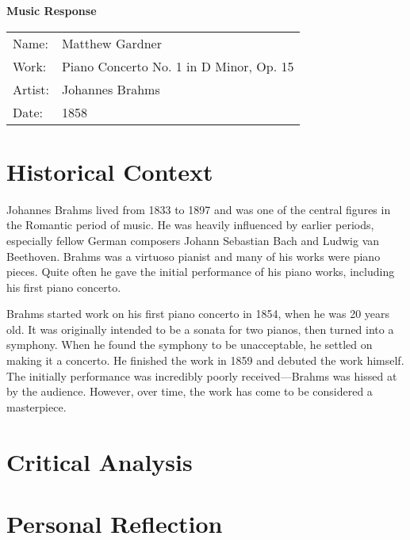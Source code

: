 \documentclass[onecolumn, 12pt]{article}
\title{}
\author{Matthew Gardner}
\date{}
\begin{document}
\textbf{Music Response}

\begin{tabular}{ll}
  Name:&Matthew Gardner \\
  Work:&Piano Concerto No. 1 in D Minor, Op. 15 \\
  Artist:&Johannes Brahms \\
  Date:&1858 \\
\end{tabular}

\section*{Historical Context}

Johannes Brahms lived from 1833 to 1897 and was one of the central figures in
the Romantic period of music.  He was heavily influenced by earlier periods,
especially fellow German composers Johann Sebastian Bach and Ludwig van
Beethoven.  Brahms was a virtuoso pianist and many of his works were piano
pieces.  Quite often he gave the initial performance of his piano works, 
including his first piano concerto.

Brahms started work on his first piano concerto in 1854, when he was 20 years
old.  It was originally intended to be a sonata for two pianos, then turned
into a symphony.  When he found the symphony to be unacceptable, he settled on
making it a concerto.  He finished the work in 1859 and debuted the work
himself.  The initially performance was incredibly poorly received---Brahms was
hissed at by the audience.  However, over time, the work has come to be
considered a masterpiece.

\section*{Critical Analysis}

\section*{Personal Reflection}
\end{document}
